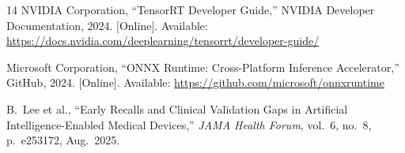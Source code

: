\documentclass[journal,twoside,9pt]{IEEEtran}
\begin{document}
\begin{thebibliography}{14}
NVIDIA Corporation, ``TensorRT Developer Guide,'' NVIDIA Developer Documentation,
2024. [Online]. Available: \url{https://docs.nvidia.com/deeplearning/tensorrt/developer-guide/}

Microsoft Corporation, ``ONNX Runtime: Cross-Platform Inference Accelerator,''
GitHub, 2024. [Online]. Available: \url{https://github.com/microsoft/onnxruntime}

B.~Lee et al., ``Early Recalls and Clinical Validation Gaps in Artificial
Intelligence-Enabled Medical Devices,'' \textit{JAMA Health Forum}, vol.\ 6,
no.\ 8, p.\ e253172, Aug.\ 2025.

\end{thebibliography}
\end{document}
